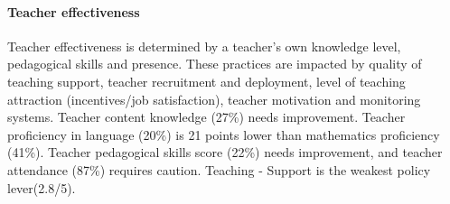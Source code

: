 \documentclass[
]{article}
\begin{document}
\hypertarget{teacher-effectiveness}{%
\paragraph{\texorpdfstring{\textbf{Teacher
effectiveness}}{Teacher effectiveness}}\label{teacher-effectiveness}}

Teacher effectiveness is determined by a teacher's own knowledge level,
pedagogical skills and presence. These practices are impacted by quality
of teaching support, teacher recruitment and deployment, level of
teaching attraction (incentives/job satisfaction), teacher motivation
and monitoring systems. Teacher content knowledge (27\%) needs
improvement. Teacher proficiency in language (20\%) is 21 points lower
than mathematics proficiency (41\%). Teacher pedagogical skills score
(22\%) needs improvement, and teacher attendance (87\%) requires
caution. Teaching - Support is the weakest policy lever(2.8/5).
\end{document}
